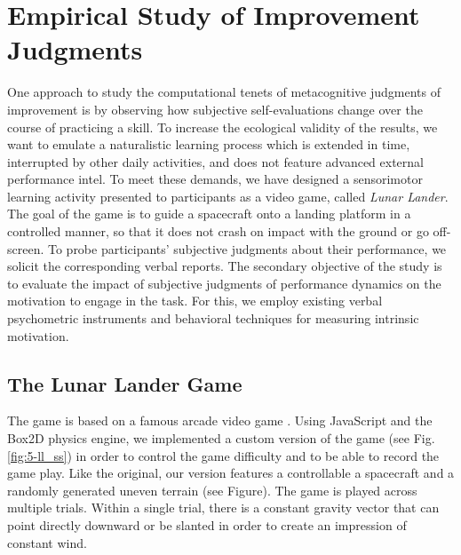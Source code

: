 \section{Empirical Study of Improvement Judgments}
One approach to study the computational tenets of metacognitive judgments of improvement is by observing how subjective self-evaluations change over the course of practicing a skill. To increase the ecological validity of the results, we want to emulate a naturalistic learning process which is extended in time, interrupted by other daily activities, and does not feature advanced external performance intel. To meet these demands, we have designed a sensorimotor learning activity presented to participants as a video game, called \emph{Lunar Lander}. The goal of the game is to guide a spacecraft onto a landing platform in a controlled manner, so that it does not crash on impact with the ground or go off-screen. To probe participants' subjective judgments about their performance, we solicit the corresponding verbal reports. The secondary objective of the study is to evaluate the impact of subjective judgments of performance dynamics on the motivation to engage in the task. For this, we employ existing verbal psychometric instruments and behavioral techniques for measuring intrinsic motivation.

\subsection{The Lunar Lander Game}

The game is based on a famous arcade video game \cite{LunarLander19792021}. Using JavaScript and the Box2D physics engine, we implemented a custom version of the game (see Fig. \ref{fig:5-ll_ss}) in order to control the game difficulty and to be able to record the game play. Like the original, our version features a controllable a spacecraft and a randomly generated uneven terrain (see Figure). The game is played across multiple trials. Within a single trial, there is a constant gravity vector that can point directly downward or be slanted in order to create an impression of constant wind.

